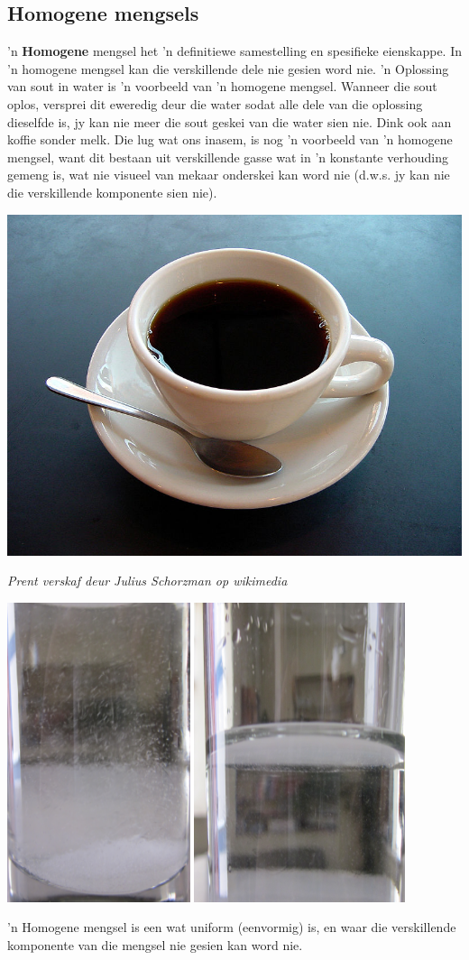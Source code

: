             \subsection*{Homogene mengsels}
            \nopagebreak
        \label{m38708*id62762}'n \textbf{Homogene} mengsel het 'n definitiewe samestelling en spesifieke eienskappe. In 'n homogene mengsel kan die verskillende dele nie gesien word nie. 'n Oplossing van sout in water is 'n voorbeeld van 'n homogene mengsel. Wanneer die sout oplos, versprei dit eweredig deur die water sodat alle dele van die oplossing dieselfde is, jy kan nie meer die sout geskei van die water sien nie. Dink ook aan koffie sonder melk. Die lug wat ons inasem, is nog 'n voorbeeld van 'n homogene mengsel, want dit bestaan uit verskillende gasse wat in 'n konstante verhouding gemeng is, wat nie visueel van mekaar onderskei kan word nie (d.w.s. jy kan nie die verskillende komponente sien nie).\par 
\begin{minipage}{.5\textwidth}
\begin{center}
 \includegraphics[width=.3\textwidth]{photos/coffeeby_JuliusSchorzman_wikimedia.jpg}\par
\textit{Prent verskaf deur Julius Schorzman op wikimedia}
\end{center}
\end{minipage}
\begin{minipage}{.5\textwidth}
\begin{center}
 \includegraphics[width=.5\textwidth]{photos/saltwater.png}\par
\end{center}
\end{minipage}
\label{m38708*fhsst!!!underscore!!!id96} { \label{m38708*meaningfhsst!!!underscore!!!id96}
        'n Homogene mengsel is een wat uniform (eenvormig) is, en waar die verskillende komponente van die mengsel nie gesien kan word nie.
         } 
